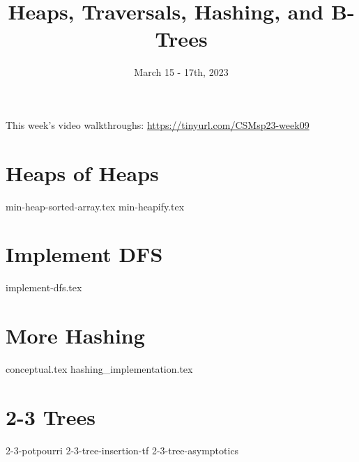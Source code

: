 \documentclass[11pt]{exam}
\title{Heaps, Traversals, Hashing, and B-Trees}
\date{March 15 - 17th, 2023}
\begin{document}
\maketitle
This week's video walkthroughs:
\href{https://tinyurl.com/CSMsp23-week09}{https://tinyurl.com/CSMsp23-week09}


\section{Heaps of Heaps}
\begin{questions}
{min-heap-sorted-array.tex}
{min-heapify.tex}
\end{questions}

\pagebreak

\section{Implement DFS}
\begin{questions}
{implement-dfs.tex}
\end{questions}

\pagebreak

\section{More Hashing}
\begin{questions}
{conceptual.tex}
{hashing_implementation.tex}
\end{questions}

\pagebreak

\section{2-3 Trees}
\begin{questions}
{2-3-potpourri}  
{2-3-tree-insertion-tf}
{2-3-tree-asymptotics}
\end{questions}
\end{document}
